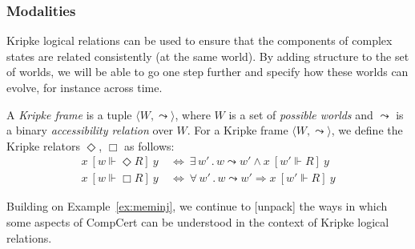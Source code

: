 \documentclass[acmsmall,timestamp,review]{acmart}
\newcommand{\ifr}[1]{\ [{#1}]\ }
\begin{document}
\subsubsection{Modalities}

Kripke logical relations
can be used to ensure that the components of complex states
are related consistently (at the same world).
By adding structure to the set of worlds,
we will be able to go one step further and
specify how these worlds can evolve,
for instance across time.

\begin{definition} %
A \emph{Kripke frame} is a tuple
$\langle W, {\leadsto} \rangle$, where
$W$ is a set of \emph{possible worlds} and
$\leadsto$ is a
binary \emph{accessibility relation} over $W$.
For a Kripke frame
$\langle W, \leadsto \rangle$,
we define the Kripke relators $\Diamond$, $\Box$ as follows:
\begin{align*}
  x \ifr{w \Vdash \Diamond R} y & \: \Leftrightarrow \:
    \exists \, w' \,.\, w \leadsto w' \wedge
      x \ifr{w' \Vdash R} y \\
  x \ifr{w \Vdash \Box R} y & \: \Leftrightarrow \:
    \forall \, w' \,.\, w \leadsto w' \Rightarrow
      x \ifr{w' \Vdash R} y
\end{align*}
\end{definition}

Building on Example~\ref{ex:meminj},
we continue to [unpack] the ways in which
some aspects of CompCert can be understood
in the context of Kripke logical relations.
\end{document}

